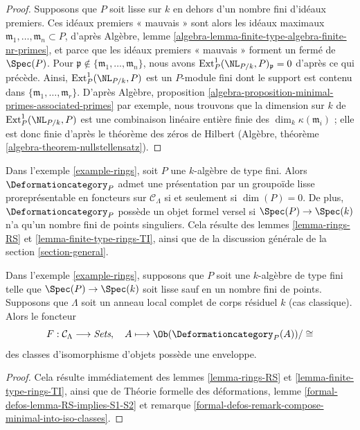 \begin{proof}
\medskip\noindent
Supposons que $P$ soit lisse sur $k$ en dehors d'un nombre fini d'idéaux premiers.
Ces idéaux premiers « mauvais » sont alors les idéaux maximaux
$\mathfrak m_1, \ldots, \mathfrak m_n \subset P$, d'après
Algèbre, lemme \ref{algebra-lemma-finite-type-algebra-finite-nr-primes},
et parce que les idéaux premiers « mauvais » forment un fermé de $\Spec(P)$.
Pour $\mathfrak p \not \in \{\mathfrak m_1, \ldots, \mathfrak m_n\}$,
nous avons $\text{Ext}^1_P(\NL_{P/k}, P)_\mathfrak p = 0$ d'après ce qui précède.
Ainsi, $\text{Ext}^1_P(\NL_{P/k}, P)$ est un $P$-module fini
dont le support est contenu dans $\{\mathfrak m_1, \ldots, \mathfrak m_r\}$.
D'après Algèbre, proposition
\ref{algebra-proposition-minimal-primes-associated-primes}
par exemple, nous trouvons que la dimension sur $k$ de
$\text{Ext}^1_P(\NL_{P/k}, P)$ est une combinaison linéaire entière finie
des $\dim_k \kappa(\mathfrak m_i)$ ; elle est donc finie d'après
le théorème des zéros de Hilbert
(Algèbre, théorème \ref{algebra-theorem-nullstellensatz}).
\end{proof}

\noindent
Dans l'exemple \ref{example-rings}, soit $P$ une
$k$-algèbre de type fini. Alors $\Deformationcategory_P$
admet une présentation par un groupoïde lisse proreprésentable en foncteurs
sur $\mathcal{C}_\Lambda$ si et seulement si $\dim(P) = 0$.
De plus, $\Deformationcategory_P$ possède un objet
formel versel si $\Spec(P) \to \Spec(k)$ n'a qu'un nombre fini de
points singuliers. Cela résulte des lemmes \ref{lemma-rings-RS} et
\ref{lemma-finite-type-rings-TI},
ainsi que de la discussion générale de la section \ref{section-general}.

\begin{lemma}
\label{lemma-rings-hull}
Dans l'exemple \ref{example-rings}, supposons que $P$ soit une
$k$-algèbre de type fini telle que $\Spec(P) \to \Spec(k)$ soit lisse sauf
en un nombre fini de points.
Supposons que $\Lambda$ soit un anneau local complet de corps résiduel $k$
(cas classique). Alors le foncteur
$$
F : \mathcal{C}_\Lambda \longrightarrow \textit{Sets},\quad
A \longmapsto \Ob(\Deformationcategory_P(A))/\cong
$$
des classes d'isomorphisme d'objets possède une enveloppe.
\end{lemma}

\begin{proof}
Cela résulte immédiatement des lemmes \ref{lemma-rings-RS} et
\ref{lemma-finite-type-rings-TI}, ainsi que de
Théorie formelle des déformations, lemme \ref{formal-defos-lemma-RS-implies-S1-S2}
et remarque \ref{formal-defos-remark-compose-minimal-into-iso-classes}.
\end{proof}

